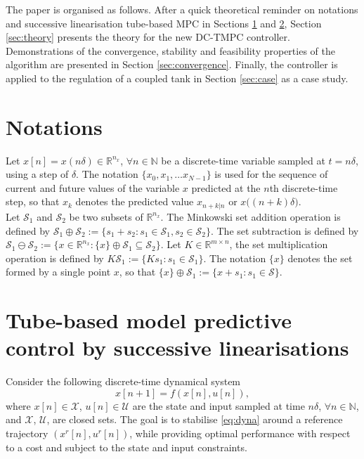 \documentclass[letterpaper, 10 pt, conference]{ieeeconf}
\begin{document}
The paper is organised as follows. After a quick theoretical reminder on notations and successive linearisation tube-based MPC in Sections  \ref{sec:notations} and \ref{sec:TMPC}, Section \ref{sec:theory} presents the theory for the new DC-TMPC controller. Demonstrations of the convergence, stability and feasibility properties of the algorithm are presented in Section  \ref{sec:convergence}. Finally, the controller is applied to the regulation of a coupled tank in Section \ref{sec:case} as a case study. 

\section{Notations}
\label{sec:notations}
Let $x[n] = x(n\delta) \in  \mathbb{R}^{n_{x}}$, $\forall n \in \mathbb{N}$ be a discrete-time variable sampled at $t=n\delta$, using a step of $\delta$. The notation $\{ x_{0} , x_{1} , \ldots x_{N-1}\}$ is used for the sequence of current and future values of the variable $x$ predicted at the $n$th discrete-time step, so that $x_k$ denotes the predicted value $x_{n+k|n}$ or $x\bigl((n+k)\delta\bigr)$.\\

Let $\mathcal{S}_1$ and $\mathcal{S}_2$ be two subsets of $\mathbb{R}^{n_{x}}$. The Minkowski set addition operation is defined by $\mathcal{S}_1 \oplus \mathcal{S}_2 := \{s_1 + s_2 : s_1 \in \mathcal{S}_1, s_2 \in \mathcal{S}_2\}$. The set subtraction is defined by $\mathcal{S}_1 \ominus \mathcal{S}_2 :=  \{x \in \mathbb{R}^{n_{x}}: \{x\} \oplus  \mathcal{S}_1 \subseteq \mathcal{S}_2\}$. Let $K \in \mathbb{R}^{m \times n}$, the set multiplication operation is defined by $ K \mathcal{S}_1 := \{K s_1 : s_1 \in \mathcal{S}_1 \}$. The notation $\{x\}$ denotes the set formed by a single point $x$, so that $\{x\} \oplus \mathcal{S}_1 := \{x + s_1 : s_1 \in \mathcal{S} \}$. 
\section{Tube-based model predictive control by successive linearisations}
\label{sec:TMPC}

Consider the following discrete-time dynamical system 
%
\begin{equation}
\label{eq:dyna}
x[n+1] = f(x[n], u[n]), 
\end{equation}
where $x[n] \in \mathcal{X}$, $u[n] \in \mathcal{U}$ are the state and input sampled at time $n\delta$, $\forall n \in \mathbb{N}$, and $\mathcal{X}$, $\mathcal{U}$, are closed sets. The goal is to stabilise \eqref{eq:dyna} around a reference trajectory $(x^r[n], u^r[n])$, while providing optimal performance with respect to a cost and subject to the state and input constraints. 
\end{document}
